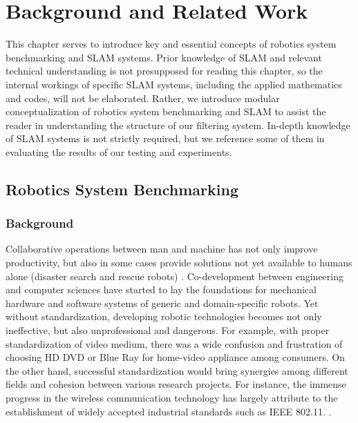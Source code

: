 
\chapter{Background and Related Work} %

\label{Chapter2} %

This chapter serves to introduce key and essential concepts of robotics system benchmarking and SLAM systems. 
Prior knowledge of SLAM and relevant technical understanding is not presupposed for reading this chapter, so the internal workings of specific SLAM systems, including the applied mathematics and codes, will not be elaborated. 
Rather, we introduce modular conceptualization of robotics system benchmarking and SLAM to assist the reader in understanding the structure of our filtering system. 
In-depth knowledge of SLAM systems is not strictly required, but we reference some of them in evaluating the results of our testing and experiments.


\section{Robotics System Benchmarking}

\subsection{Background}
Collaborative operations between man and machine has not only improve productivity, but also in some cases provide solutions not yet available to humans alone (disaster search and rescue robots) \cite{madhavan2009benchmarking}. 
Co-development between engineering and computer sciences have started to lay the foundations for mechanical hardware and software systems of generic and domain-specific robots. 
Yet without standardization, developing robotic technologies becomes not only ineffective, but also unprofessional and dangerous. 
For example, with proper standardization of video medium, there was a wide confusion and frustration of choosing HD DVD or Blue Ray for home-video appliance among consumers. 
On the other hand, successful standardization would bring synergies among different fields and cohesion between various research projects. 
For instance, the immense progress in the wireless communication technology has largely attribute to the establishment of widely accepted industrial standards such as IEEE 802.11. \cite{madhavan2009benchmarking}.


